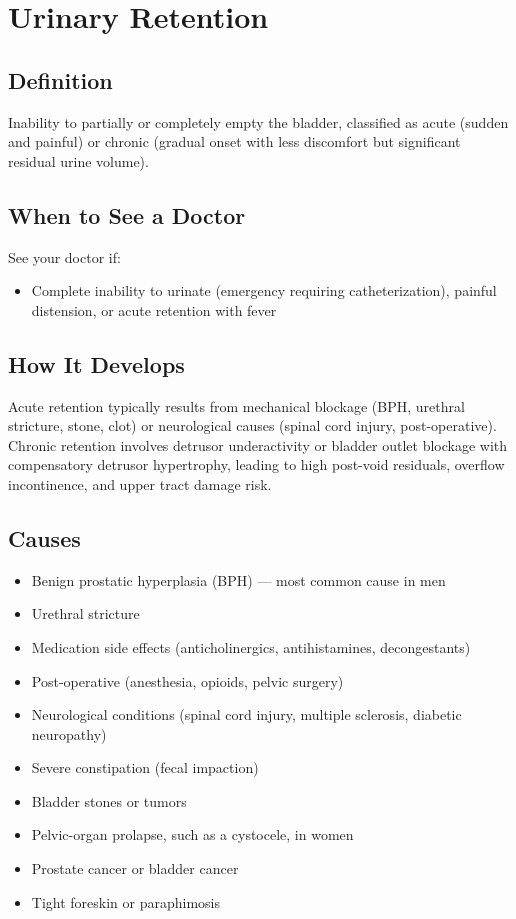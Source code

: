 \chapter{Urinary Retention}

\section*{Definition}
Inability to partially or completely empty the bladder, classified as acute (sudden and painful) or chronic (gradual onset with less discomfort but significant residual urine volume).

\section*{When to See a Doctor}
See your doctor if:
\begin{itemize}
  \item Complete inability to urinate (emergency requiring catheterization), painful distension, or acute retention with fever
\end{itemize}

\section*{How It Develops}
Acute retention typically results from mechanical blockage (BPH, urethral stricture, stone, clot) or neurological causes (spinal cord injury, post-operative). Chronic retention involves detrusor underactivity or bladder outlet blockage with compensatory detrusor hypertrophy, leading to high post-void residuals, overflow incontinence, and upper tract damage risk.

\section*{Causes}
\begin{itemize}
  \item Benign prostatic hyperplasia (BPH) — most common cause in men
  \item Urethral stricture
  \item Medication side effects (anticholinergics, antihistamines, decongestants)
  \item Post-operative (anesthesia, opioids, pelvic surgery)
  \item Neurological conditions (spinal cord injury, multiple sclerosis, diabetic neuropathy)
  \item Severe constipation (fecal impaction)
  \item Bladder stones or tumors
  \item Pelvic-organ prolapse, such as a cystocele, in women
  \item Prostate cancer or bladder cancer
  \item Tight foreskin or paraphimosis
\end{itemize}

